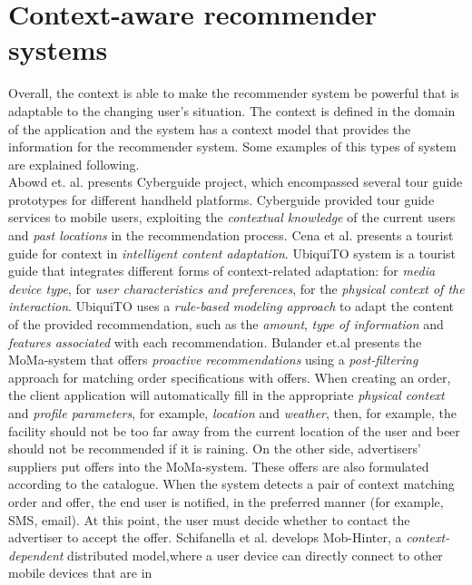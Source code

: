 \section{Context-aware recommender systems} 
Overall, the context is able to make the recommender system be
powerful that is adaptable to the changing user's situation. The
context is defined in the domain of the application and the system has
a context model that provides the information for the recommender
system. Some  examples of this types of system are explained
following. \\
Abowd et. al.\cite{abowd1997cyberguide} presents 
Cyberguide project, which encompassed several tour 
guide prototypes for different handheld platforms. 
Cyberguide provided tour guide services to mobile users,
exploiting the \textit{contextual knowledge} of the current users and 
\textit{past locations} in the recommendation process. 
Cena et al.\cite{cena2006integrating} presents a tourist guide for
context in \textit{intelligent content adaptation}. UbiquiTO system is a
tourist guide that integrates different forms of context-related
adaptation: for \textit{media device type}, for \textit{user characteristics and
preferences}, for the \textit{physical context of the interaction}. UbiquiTO uses
a \textit{rule-based modeling approach} to adapt the content of the provided
recommendation, such as the \textit{amount}, \textit{type of information} and 
\textit{features associated} with each recommendation. 
Bulander et.al\cite{bulander2005comparison} presents the MoMa-system 
that offers \textit{proactive recommendations} using a \textit{post-filtering} 
approach for matching order specifications with offers. 
When creating an order, the client application will automatically fill in the 
appropriate \textit{physical context} and \textit{profile parameters}, for example, 
\textit{location} and \textit{weather}, then, for example, the facility should not be 
too far away from the current location of the user and beer should not be
recommended if it is raining. On the other side, advertisers'
suppliers put offers into the MoMa-system. These offers are also
formulated according to the catalogue. When the system detects a pair
of context matching order and offer, the end user is notified, in the
preferred manner (for example, SMS, email). At this point, the user
must decide whether to contact the advertiser to accept the offer.
Schifanella et al.\cite{schifanella2008mobhinter} develops
Mob-Hinter, a \textit{context-dependent} distributed model,where a user 
device can directly connect to other mobile devices that are in 

